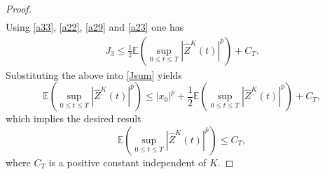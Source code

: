 \documentclass[preprint,12pt,compress]{elsarticle}
\begin{document}
\begin{proof}
\begin{equation}
\begin{split}
\end{split}
\end{equation}
Using \eqref{a33}, \eqref{a22}, \eqref{a29} and \eqref{a23} one has
\begin{equation}  \label{J3}
\begin{split}
	{J_3}  \le \frac{1}{2}\mathbb{E}\left( {\mathop {\sup }\limits_{0 \le t \le T} {{\left| {{{\hat Z}^K}(t)} \right|}^{\bar p}}} \right)  + {C_T} .
\end{split}
\end{equation}
Substituting the above into \eqref{Jsum} yields
\begin{equation*}
	\mathbb{E}\left( {\mathop {\sup }\limits_{0 \le t \le T} {{\left| {{{\hat Z}^K}(t)} \right|}^{\bar p}}} \right) \le {\left| {{x_0}} \right|^{\bar p}} +  \frac{1}{2}\mathbb{E}\left( {\mathop {\sup }\limits_{0 \le t \le T} {{\left| {{{\hat Z}^K}(t)} \right|}^{\bar p}}} \right) + {C_T},
\end{equation*}
which implies the desired result
\begin{equation}  \label{a24}
	\mathbb{E}\left( {\mathop {\sup }\limits_{0 \le t \le T} {{\left| {{{\hat Z}^K}(t)} \right|}^{\bar p}}} \right) \le {C_T},
\end{equation}
where $C_T$ is a positive constant independent of $K$. 


\end{proof}
\end{document}

